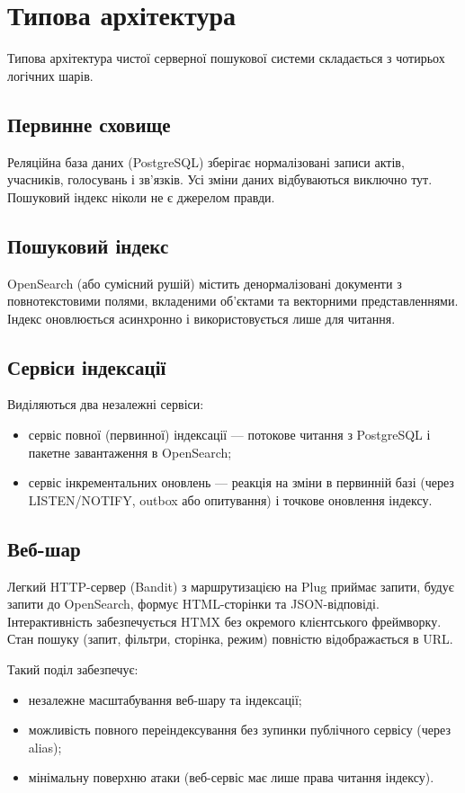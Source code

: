 \documentclass[12pt,a4paper]{article}
\begin{document}
\section{Типова архітектура}

Типова архітектура чистої серверної пошукової системи складається з чотирьох логічних шарів.

\subsection{Первинне сховище}
Реляційна база даних (PostgreSQL) зберігає нормалізовані записи актів, учасників, голосувань і зв'язків. Усі зміни даних відбуваються виключно тут. Пошуковий індекс ніколи не є джерелом правди.

\subsection{Пошуковий індекс}
OpenSearch (або сумісний рушій) містить денормалізовані документи з повнотекстовими полями, вкладеними об'єктами та векторними представленнями. Індекс оновлюється асинхронно і використовується лише для читання.

\subsection{Сервіси індексації}
Виділяються два незалежні сервіси:
\begin{itemize}
  \item сервіс повної (первинної) індексації — потокове читання з PostgreSQL і пакетне завантаження в OpenSearch;
  \item сервіс інкрементальних оновлень — реакція на зміни в первинній базі (через LISTEN/NOTIFY, outbox або опитування) і точкове оновлення індексу.
\end{itemize}

\subsection{Веб-шар}
Легкий HTTP-сервер (Bandit) з маршрутизацією на Plug приймає запити, будує запити до OpenSearch, формує HTML-сторінки та JSON-відповіді. Інтерактивність забезпечується HTMX без окремого клієнтського фреймворку. Стан пошуку (запит, фільтри, сторінка, режим) повністю відображається в URL.

Такий поділ забезпечує:
\begin{itemize}
  \item незалежне масштабування веб-шару та індексації;
  \item можливість повного переіндексування без зупинки публічного сервісу (через alias);
  \item мінімальну поверхню атаки (веб-сервіс має лише права читання індексу).
\end{itemize}
\end{document}
